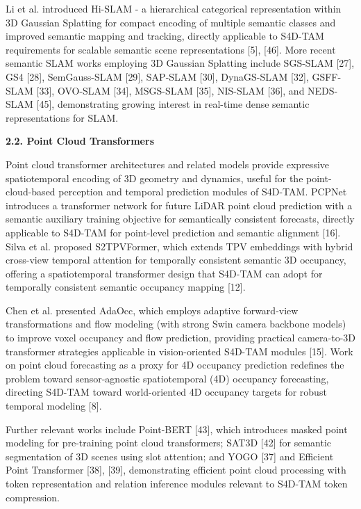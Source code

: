 \documentclass[
]{article}
\begin{document}
Li et al. introduced Hi-SLAM - a hierarchical categorical representation
within 3D Gaussian Splatting for compact encoding of multiple semantic
classes and improved semantic mapping and tracking, directly applicable
to S4D-TAM requirements for scalable semantic scene representations
{[}5{]}, {[}46{]}. More recent semantic SLAM works employing 3D Gaussian
Splatting include SGS-SLAM {[}27{]}, GS4 {[}28{]}, SemGauss-SLAM
{[}29{]}, SAP-SLAM {[}30{]}, DynaGS-SLAM {[}32{]}, GSFF-SLAM {[}33{]},
OVO-SLAM {[}34{]}, MSGS-SLAM {[}35{]}, NIS-SLAM {[}36{]}, and NEDS-SLAM
{[}45{]}, demonstrating growing interest in real-time dense semantic
representations for SLAM.

\textbf{2.2. Point Cloud Transformers}

Point cloud transformer architectures and related models provide
expressive spatiotemporal encoding of 3D geometry and dynamics, useful
for the point-cloud-based perception and temporal prediction modules of
S4D-TAM. PCPNet introduces a transformer network for future LiDAR point
cloud prediction with a semantic auxiliary training objective for
semantically consistent forecasts, directly applicable to S4D-TAM for
point-level prediction and semantic alignment {[}16{]}. Silva et al.
proposed S2TPVFormer, which extends TPV embeddings with hybrid
cross-view temporal attention for temporally consistent semantic 3D
occupancy, offering a spatiotemporal transformer design that S4D-TAM can
adopt for temporally consistent semantic occupancy mapping {[}12{]}.

Chen et al. presented AdaOcc, which employs adaptive forward-view
transformations and flow modeling (with strong Swin camera backbone
models) to improve voxel occupancy and flow prediction, providing
practical camera-to-3D transformer strategies applicable in
vision-oriented S4D-TAM modules {[}15{]}. Work on point cloud
forecasting as a proxy for 4D occupancy prediction redefines the problem
toward sensor-agnostic spatiotemporal (4D) occupancy forecasting,
directing S4D-TAM toward world-oriented 4D occupancy targets for robust
temporal modeling {[}8{]}.

Further relevant works include Point-BERT {[}43{]}, which introduces
masked point modeling for pre-training point cloud transformers; SAT3D
{[}42{]} for semantic segmentation of 3D scenes using slot attention;
and YOGO {[}37{]} and Efficient Point Transformer {[}38{]}, {[}39{]},
demonstrating efficient point cloud processing with token representation
and relation inference modules relevant to S4D-TAM token compression.
\end{document}
